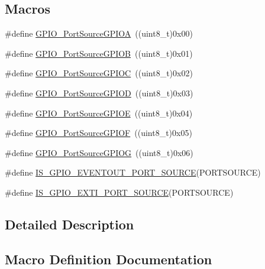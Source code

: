 \subsection*{Macros}
\begin{DoxyCompactItemize}
\item 
\#define \hyperlink{group___g_p_i_o___port___sources_gacddaa6b6535b5de02ba99e75111c4924}{G\+P\+I\+O\+\_\+\+Port\+Source\+G\+P\+I\+OA}~((uint8\+\_\+t)0x00)
\item 
\#define \hyperlink{group___g_p_i_o___port___sources_ga20a7ea6589564aee1fd5344bf01e65e5}{G\+P\+I\+O\+\_\+\+Port\+Source\+G\+P\+I\+OB}~((uint8\+\_\+t)0x01)
\item 
\#define \hyperlink{group___g_p_i_o___port___sources_ga7511e96933d503ecf7128ebaff613e7e}{G\+P\+I\+O\+\_\+\+Port\+Source\+G\+P\+I\+OC}~((uint8\+\_\+t)0x02)
\item 
\#define \hyperlink{group___g_p_i_o___port___sources_ga68309c29660ae328d3699781520e3d21}{G\+P\+I\+O\+\_\+\+Port\+Source\+G\+P\+I\+OD}~((uint8\+\_\+t)0x03)
\item 
\#define \hyperlink{group___g_p_i_o___port___sources_ga8b849f35292768d73a9f9a76cac96456}{G\+P\+I\+O\+\_\+\+Port\+Source\+G\+P\+I\+OE}~((uint8\+\_\+t)0x04)
\item 
\#define \hyperlink{group___g_p_i_o___port___sources_ga19dfaf7ac2cdf66b697bcd8665b860ef}{G\+P\+I\+O\+\_\+\+Port\+Source\+G\+P\+I\+OF}~((uint8\+\_\+t)0x05)
\item 
\#define \hyperlink{group___g_p_i_o___port___sources_ga43af0aa9b42aefa2c7d24dfa9889040b}{G\+P\+I\+O\+\_\+\+Port\+Source\+G\+P\+I\+OG}~((uint8\+\_\+t)0x06)
\item 
\#define \hyperlink{group___g_p_i_o___port___sources_ga40d86e5f9f013777038932f57bc6bbef}{I\+S\+\_\+\+G\+P\+I\+O\+\_\+\+E\+V\+E\+N\+T\+O\+U\+T\+\_\+\+P\+O\+R\+T\+\_\+\+S\+O\+U\+R\+CE}(P\+O\+R\+T\+S\+O\+U\+R\+CE)
\item 
\#define \hyperlink{group___g_p_i_o___port___sources_ga53c3a469f6b286da38bc198acf25e8f1}{I\+S\+\_\+\+G\+P\+I\+O\+\_\+\+E\+X\+T\+I\+\_\+\+P\+O\+R\+T\+\_\+\+S\+O\+U\+R\+CE}(P\+O\+R\+T\+S\+O\+U\+R\+CE)
\end{DoxyCompactItemize}


\subsection{Detailed Description}


\subsection{Macro Definition Documentation}
\mbox{\label{group___g_p_i_o___port___sources_gacddaa6b6535b5de02ba99e75111c4924}} 
